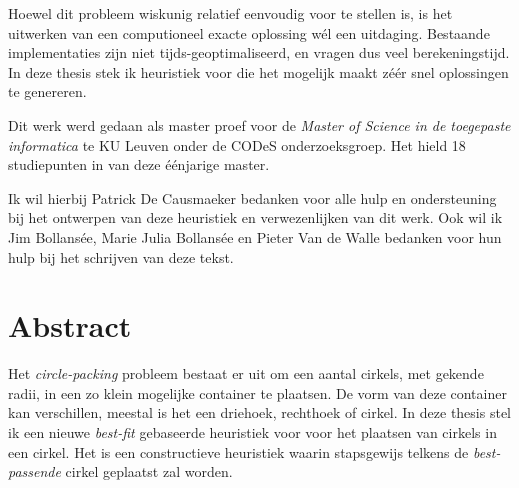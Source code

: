 \documentclass[12pt,a4paper,oneside]{book}
\begin{document}
Hoewel dit probleem wiskunig relatief eenvoudig voor te stellen is, is het uitwerken van een computioneel exacte oplossing wél een uitdaging.
Bestaande implementaties zijn niet tijds-geoptimaliseerd, en vragen dus veel berekeningstijd. 
In deze thesis stek ik heuristiek voor die het mogelijk maakt zéér snel oplossingen te genereren.

Dit werk werd gedaan als master proef voor de \textit{Master of Science in de toegepaste informatica} te KU Leuven onder de CODeS onderzoeksgroep.
Het hield 18 studiepunten in van deze éénjarige master.

Ik wil hierbij Patrick De Causmaeker bedanken voor alle hulp en ondersteuning bij het ontwerpen van deze heuristiek en verwezenlijken van dit werk.
Ook wil ik Jim Bollansée, Marie Julia Bollansée en Pieter Van de Walle bedanken voor hun hulp bij het schrijven van deze tekst.


\newpage

\chapter*{Abstract}


Het \textit{circle-packing} probleem bestaat er uit om een aantal cirkels, met gekende radii, in een zo klein mogelijke container te plaatsen.
De vorm van deze container kan verschillen, meestal is het een driehoek, rechthoek of cirkel.
In deze thesis stel ik een nieuwe \textit{best-fit} gebaseerde heuristiek voor voor het plaatsen van cirkels in een cirkel.
Het is een constructieve heuristiek waarin stapsgewijs telkens de \textit{best-passende} cirkel geplaatst zal worden.
\end{document}
